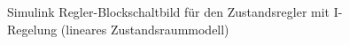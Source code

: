 \begin{figure}[H]
    \centering
    \caption[Zustandsregler mit I-Regelung Simulink (linear)]{Simulink Regler-Blockschaltbild für den Zustandsregler mit I-Regelung (lineares Zustandsraummodell)}
    \label{fig:Bild17}
\end{figure}

